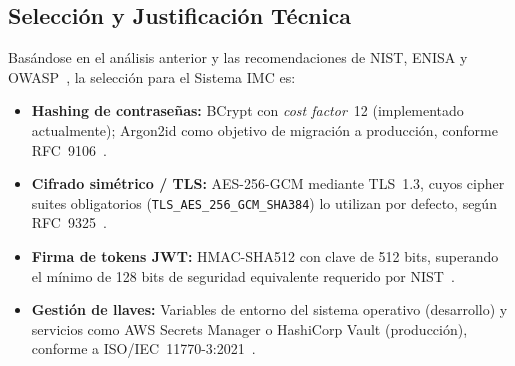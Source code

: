 \subsection*{Selección y Justificación Técnica}

Basándose en el análisis anterior y las recomendaciones de NIST, ENISA y
OWASP~\cite{enisa2021,owasp2023,fips197upd1}, la selección para el Sistema IMC es:

\begin{itemize}
    \item \textbf{Hashing de contraseñas:} BCrypt con \textit{cost factor}~12 (implementado
          actualmente); Argon2id como objetivo de migración a producción, conforme
          RFC~9106~\cite{argon2rfc2021}.
    \item \textbf{Cifrado simétrico / TLS:} AES-256-GCM mediante TLS~1.3, cuyos cipher suites
          obligatorios (\texttt{TLS\_AES\_256\_GCM\_SHA384}) lo utilizan por defecto, según
          RFC~9325~\cite{tlsrfc9325}.
    \item \textbf{Firma de tokens JWT:} HMAC-SHA512 con clave de 512 bits, superando el mínimo de
          128 bits de seguridad equivalente requerido por NIST~\cite{nistir8413}.
    \item \textbf{Gestión de llaves:} Variables de entorno del sistema operativo (desarrollo) y
          servicios como AWS Secrets Manager o HashiCorp Vault (producción), conforme a
          ISO/IEC~11770-3:2021~\cite{isoiec117703}.
\end{itemize}
